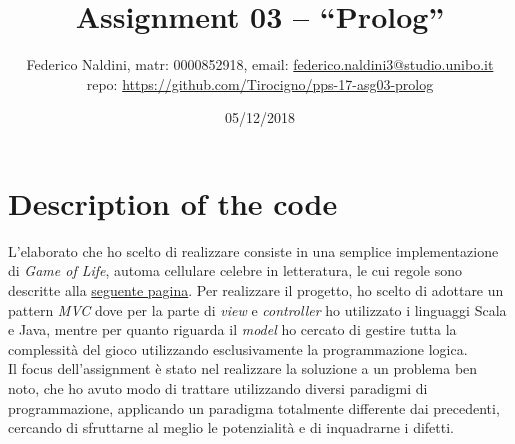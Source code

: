 \documentclass[10pt,italian]{article}
\title{\vspace{-70pt}Assignment 03 -- ``Prolog''}
\author{Federico Naldini, matr: 0000852918, email: {\url{federico.naldini3@studio.unibo.it}}\\ repo: {\url{https://github.com/Tirocigno/pps-17-asg03-prolog}}
\date{05/12/2018}}
\begin{document}
\maketitle
\vspace{-30pt}

\section{Description of the code}
L'elaborato che ho scelto di realizzare consiste in una semplice implementazione di \textit{Game of Life}, automa cellulare celebre in letteratura, le cui regole sono descritte alla \href{https://en.wikipedia.org/wiki/Conway\%27s_Game_of_Life#Rules}{seguente pagina}.
Per realizzare il progetto, ho scelto di adottare un pattern \textit{MVC} dove per la parte di \textit{view} e \textit{controller} ho utilizzato i linguaggi Scala e Java, mentre per quanto riguarda il \textit{model} ho cercato di gestire tutta la complessità del gioco utilizzando esclusivamente la programmazione logica.\\
Il focus dell'assignment è stato nel realizzare la soluzione a un problema ben noto, che ho avuto modo di trattare utilizzando diversi paradigmi di programmazione, applicando un paradigma totalmente differente dai precedenti, cercando di sfruttarne al meglio le potenzialità e di inquadrarne i difetti.
\end{document}
